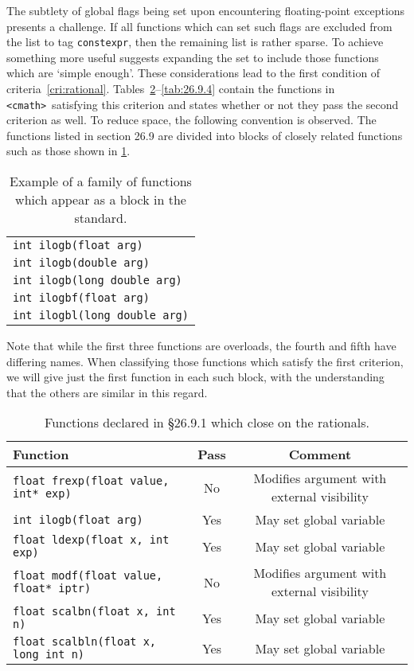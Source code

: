\documentclass[prd,preprint,amsmath,amssymb,nofootinbib,eqsecnum]{revtex4-1}
\newcommand{\code}[1]{{\tt #1}}
\newcommand{\constexpr}{\code{constexpr}}
\newcommand{\header}[1]{{\tt <#1>}}
\newcommand{\cmath}{\header{cmath}}
\begin{document}
The subtlety of global flags being set upon encountering floating-point exceptions presents a challenge. If all functions which can set such flags are excluded from the list to tag \constexpr, then the remaining list is rather sparse. To achieve something more useful suggests expanding the set to include those functions which are `simple enough'. These considerations lead to the first condition of criteria~\ref{cri:rational}. Tables~\ref{tab:26.9.1}--\ref{tab:26.9.4} contain the functions in \cmath\ satisfying this criterion and states whether or not they pass the second criterion as well. To reduce space, the following convention is observed. The functions listed in section 26.9 are divided into blocks of closely related functions such as those shown in \ref{tab:example}. 
\begin{table}
	\begin{tabular}{l}
		\code{int ilogb(float arg)}
	\\
		\code{int ilogb(double arg)}
	\\
		\code{int ilogb(long double arg)}
	\\
		\code{int ilogbf(float arg)}
	\\
		\code{int ilogbl(long double arg)}
	\end{tabular}
\caption{Example of a family of functions which appear as a block in the standard.}
\label{tab:example}
\end{table}
Note that while the first three functions are overloads, the fourth and fifth have differing names.
When classifying those functions which satisfy the first criterion, we will give just the first function in each such block, with the understanding that the others are similar in this regard.

\begin{table}[h]
	\begin{tabular}{lcc}
		Function & Pass & Comment
	\\
	\hline \hline
		\code{float frexp(float value, int* exp)} & No & Modifies argument with external visibility
	\\
	\hline
		\code{int ilogb(float arg)} & Yes & May set global variable
	\\
	\hline
		\code{float ldexp(float x, int exp)} & Yes & May set global variable
	\\
	\hline
		\code{float modf(float value, float* iptr)} & No & Modifies argument with external visibility
	\\
	\hline
		\code {float scalbn(float x, int n)} & Yes & May set global variable
	\\
	\hline
		\code {float scalbln(float x, long int n)} & Yes & May set global variable
	\end{tabular}
\caption{Functions declared in \S 26.9.1 which close on the rationals.}
\label{tab:26.9.1}
\end{table}
\end{document}
